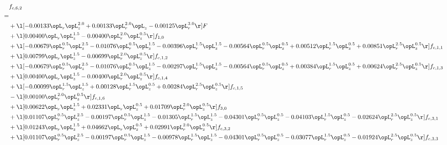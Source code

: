\begin{alignat}{2} 
\label{eq:f_62_1} 
& f_{c,6,2} \nonumber \\ 
 = \\ 
& + \l[  -0.00133 \opL_r \opL_z^{2.0} +  0.00133 \opL_r^{2.0} \opL_z   -0.00125 \opL_r^{3.0}  \r] F \nonumber \\ 
& + \l[  0.00400 \opL_r \opL_z^{1.5}   -0.00400 \opL_r^{2.0} \opL_z^{0.5}  \r] f_{1,0} \nonumber \\ 
& + \l[  -0.00679 \opL_r^{0.5} \opL_z^{2.5}   -0.01076 \opL_r^{0.5} \opL_z^{1.5}   -0.00396 \opL_r^{1.5} \opL_z^{1.5}   -0.00564 \opL_r^{0.5} \opL_z^{0.5} +  0.00512 \opL_r^{1.5} \opL_z^{0.5} +  0.00851 \opL_r^{2.5} \opL_z^{0.5}  \r] f_{c,1,1} \nonumber \\ 
& + \l[  0.00799 \opL_r \opL_z^{1.5}   -0.00699 \opL_r^{2.0} \opL_z^{0.5}  \r] f_{c,1,2} \nonumber \\ 
& + \l[  -0.00679 \opL_r^{0.5} \opL_z^{2.5}   -0.01076 \opL_r^{0.5} \opL_z^{1.5}   -0.00297 \opL_r^{1.5} \opL_z^{1.5}   -0.00564 \opL_r^{0.5} \opL_z^{0.5} +  0.00384 \opL_r^{1.5} \opL_z^{0.5} +  0.00624 \opL_r^{2.5} \opL_z^{0.5}  \r] f_{c,1,3} \nonumber \\ 
& + \l[  0.00400 \opL_r \opL_z^{1.5}   -0.00400 \opL_r^{2.0} \opL_z^{0.5}  \r] f_{c,1,4} \nonumber \\ 
& + \l[  -0.00099 \opL_r^{1.5} \opL_z^{1.5} +  0.00128 \opL_r^{1.5} \opL_z^{0.5} +  0.00284 \opL_r^{2.5} \opL_z^{0.5}  \r] f_{c,1,5} \nonumber \\ 
& - \l[  0.00100 \opL_r^{2.0} \opL_z^{0.5}  \r] f_{c,1,6} \nonumber \\ 
& + \l[  0.00622 \opL_r \opL_z^{1.5} +  0.02331 \opL_r \opL_z^{0.5} +  0.01709 \opL_r^{2.0} \opL_z^{0.5}  \r] f_{3,0} \nonumber \\ 
& + \l[  0.01107 \opL_r^{0.5} \opL_z^{2.5}   -0.00197 \opL_r^{0.5} \opL_z^{1.5}   -0.01305 \opL_r^{1.5} \opL_z^{1.5}   -0.04301 \opL_r^{0.5} \opL_z^{0.5}   -0.04103 \opL_r^{1.5} \opL_z^{0.5}   -0.02624 \opL_r^{2.5} \opL_z^{0.5}  \r] f_{c,3,1} \nonumber \\ 
& + \l[  0.01243 \opL_r \opL_z^{1.5} +  0.04662 \opL_r \opL_z^{0.5} +  0.02991 \opL_r^{2.0} \opL_z^{0.5}  \r] f_{c,3,2} \nonumber \\ 
& + \l[  0.01107 \opL_r^{0.5} \opL_z^{2.5}   -0.00197 \opL_r^{0.5} \opL_z^{1.5}   -0.00978 \opL_r^{1.5} \opL_z^{1.5}   -0.04301 \opL_r^{0.5} \opL_z^{0.5}   -0.03077 \opL_r^{1.5} \opL_z^{0.5}   -0.01924 \opL_r^{2.5} \opL_z^{0.5}  \r] f_{c,3,3} \nonumber \\ 

\end{alignat}
